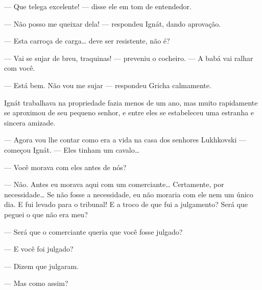 --- Que telega excelente! --- disse ele em tom de entendedor.

--- Não posso me queixar dela! --- respondeu Ignát, dando aprovação.

--- Esta carroça de carga\ldots{} deve ser resistente, não é?

--- Vai se sujar de breu, traquinas! --- preveniu o cocheiro. --- A babá
vai ralhar com você.

--- Está bem. Não vou me sujar --- respondeu Gricha calmamente.

Ignát trabalhava na propriedade fazia menos de um ano, mas muito
rapidamente se aproximou de seu pequeno senhor, e entre eles se
estabeleceu uma estranha e sincera amizade.

--- Agora vou lhe contar como era a vida na casa dos senhores
Lukhkovski --- começou Ignát. --- Eles tinham um cavalo\ldots{}

--- Você morava com eles antes de nós?

--- Não. Antes eu morava aqui com um comerciante\ldots{} Certamente, por
necessidade\ldots{} Se não fosse a necessidade, eu não moraria com ele nem um
único dia. E fui levado para o tribunal! E a troco de que fui a
julgamento? Será que peguei o que não era meu?

--- Será que o comerciante queria que você fosse julgado?


--- E você foi julgado?

--- Dizem que julgaram.

--- Mas como assim?

